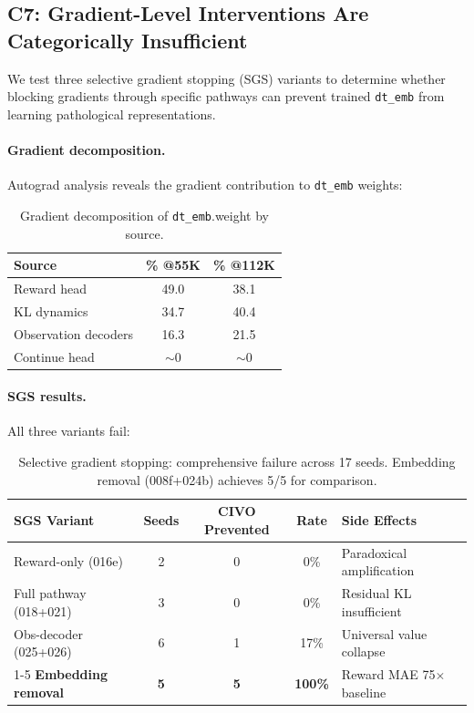 \documentclass[letterpaper]{article}
\newcommand{\dtemb}{\texttt{dt\_emb}\xspace}
\begin{document}
\subsection{C7: Gradient-Level Interventions Are Categorically Insufficient}
\label{sec:c7}

We test three selective gradient stopping (SGS) variants to determine whether blocking gradients through specific pathways can prevent trained \dtemb from learning pathological representations.

\paragraph{Gradient decomposition.}
Autograd analysis reveals the gradient contribution to \dtemb weights:

\begin{table}[h]
\centering
\caption{Gradient decomposition of \dtemb.weight by source.}
\label{tab:grad_decomp}
\begin{tabular}{lcc}
\toprule
Source & \% @55K & \% @112K \\
\midrule
Reward head & 49.0 & 38.1 \\
KL dynamics & 34.7 & 40.4 \\
Observation decoders & 16.3 & 21.5 \\
Continue head & $\sim$0 & $\sim$0 \\
\bottomrule
\end{tabular}
\end{table}

\paragraph{SGS results.}
All three variants fail:

\begin{table}[h]
\centering
\caption{Selective gradient stopping: comprehensive failure across 17 seeds. Embedding removal (008f+024b) achieves 5/5 for comparison.}
\label{tab:sgs}
\begin{tabular}{lcccl}
\toprule
SGS Variant & Seeds & CIVO Prevented & Rate & Side Effects \\
\midrule
Reward-only (016e) & 2 & 0 & 0\% & Paradoxical amplification \\
Full pathway (018+021) & 3 & 0 & 0\% & Residual KL insufficient \\
Obs-decoder (025+026) & 6 & 1 & 17\% & Universal value collapse \\
\cmidrule(lr){1-5}
\textbf{Embedding removal} & \textbf{5} & \textbf{5} & \textbf{100\%} & Reward MAE 75$\times$ baseline \\
\bottomrule
\end{tabular}
\end{table}
\end{document}
